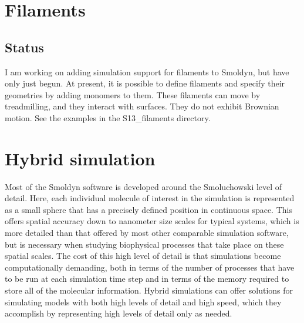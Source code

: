 \documentclass {book}
\begin{document}
\chapter{Filaments}

\section{Status}

I am working on adding simulation support for filaments to Smoldyn, but have only just begun. At present, it is possible to define filaments and specify their geometries by adding monomers to them. These filaments can move by treadmilling, and they interact with surfaces. They do not exhibit Brownian motion. See the examples in the S13\_filaments directory.


\chapter{Hybrid simulation}

Most of the Smoldyn software is developed around the Smoluchowski level of detail. Here, each individual molecule of interest in the simulation is represented as a small sphere that has a precisely defined position in continuous space. This offers spatial accuracy down to nanometer size scales for typical systems, which is more detailed than that offered by most other comparable simulation software, but is necessary when studying biophysical processes that take place on these spatial scales. The cost of this high level of detail is that simulations become computationally demanding, both in terms of the number of processes that have to be run at each simulation time step and in terms of the memory required to store all of the molecular information. Hybrid simulations can offer solutions for simulating models with both high levels of detail and high speed, which they accomplish by representing high levels of detail only as needed.
\end{document}
